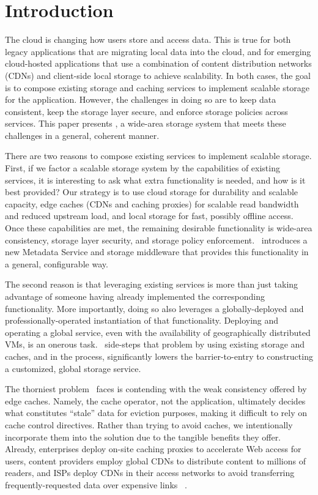 \section{Introduction}
\label{sec:introduction}

The cloud is changing how users store and access data.  This is true
for both legacy applications that are migrating local data 
into the cloud, and for emerging cloud-hosted applications
that use a combination of content distribution networks (CDNs) and
client-side local storage to achieve scalability.  In both cases, the goal is to 
compose existing storage and caching services to
implement scalable storage for the application.  However, the
challenges in doing so are to keep data
consistent, keep the storage layer secure, and
enforce storage policies across services.  This paper 
presents \Syndicate, a wide-area storage system 
that meets these challenges in a general, coherent manner.

There are two reasons to compose existing services to implement scalable storage. 
First, if we factor a scalable storage system by the
capabilities of existing services,
it is interesting to ask what extra functionality
is needed, and how is it best provided?
Our strategy is to use cloud storage for durability and 
scalable capacity, edge caches (CDNs and caching proxies)
for scalable read bandwidth and reduced upstream load,
and local storage for fast, possibly offline access.
Once these capabilities are met, the remaining
desirable functionality is wide-area consistency,
storage layer security, and storage policy enforcement.
\Syndicate\ introduces a new Metadata Service and storage
middleware that provides this functionality in a general,
configurable way.

The second reason is that leveraging existing services
is more than just taking advantage of someone having 
already implemented the corresponding functionality.
More importantly, doing so also leverages a globally-deployed
and professionally-operated instantiation of that functionality.
Deploying and operating a global service, even with 
the availability of geographically distributed VMs, is an
onerous task.  \Syndicate\ side-steps that problem by 
using existing storage and caches, and in the process,
significantly lowers the barrier-to-entry to constructing a 
customized, global storage service.

The thorniest problem \Syndicate\ faces is contending 
with the weak consistency offered by edge caches.  Namely,
the cache operator, not the application, ultimately decides
what constitutes ``stale'' data for eviction purposes, making
it difficult to rely on cache control directives.
Rather than trying to avoid caches, we intentionally incorporate 
them into the solution due to the tangible benefits they 
offer.  Already, enterprises deploy on-site caching proxies to 
accelerate Web access for users, content providers employ 
global CDNs to distribute content to millions of readers,
and ISPs deploy CDNs in their access networks to avoid 
transferring frequently-requested data over expensive links
~\cite{akamai,coralcdn,coblitz}.

